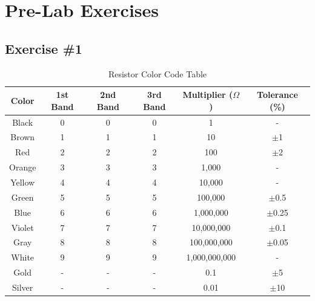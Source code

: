 \chapter{Pre-Lab Exercises}

\section{Exercise \#1}

\begin{table}[h]
    \centering
    \begin{tabular}{|c|c|c|c|c|c|}
        \hline
        Color   & 1st Band & 2nd Band & 3rd Band & Multiplier (\(\Omega\)) & Tolerance (\%) \\ \hline
        Black   & 0        & 0        & 0        & 1                     & -              \\ \hline
        Brown   & 1        & 1        & 1        & 10                    & \(\pm\)1       \\ \hline
        Red     & 2        & 2        & 2        & 100                   & \(\pm\)2       \\ \hline
        Orange  & 3        & 3        & 3        & 1,000                 & -              \\ \hline
        Yellow  & 4        & 4        & 4        & 10,000                & -              \\ \hline
        Green   & 5        & 5        & 5        & 100,000               & \(\pm\)0.5     \\ \hline
        Blue    & 6        & 6        & 6        & 1,000,000             & \(\pm\)0.25    \\ \hline
        Violet  & 7        & 7        & 7        & 10,000,000            & \(\pm\)0.1     \\ \hline
        Gray    & 8        & 8        & 8        & 100,000,000           & \(\pm\)0.05    \\ \hline
        White   & 9        & 9        & 9        & 1,000,000,000         & -              \\ \hline
        Gold    & -        & -        & -        & 0.1                   & \(\pm\)5       \\ \hline
        Silver  & -        & -        & -        & 0.01                  & \(\pm\)10      \\ \hline
    \end{tabular}
    \caption{Resistor Color Code Table \cite{resistor-calculator}}
\end{table}

